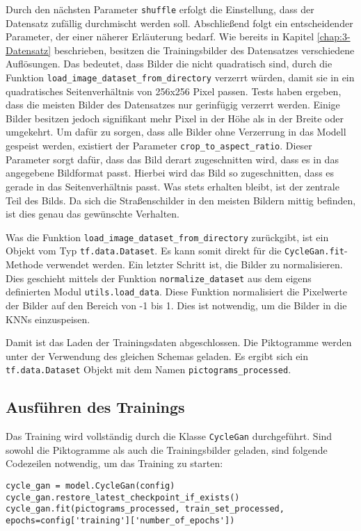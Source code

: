 Durch den nächsten Parameter \texttt{shuffle} erfolgt die Einstellung, dass der Datensatz zufällig durchmischt werden soll. Abschließend folgt ein entscheidender Parameter, der einer näherer Erläuterung bedarf. Wie bereits in Kapitel \ref{chap:3-Datensatz} beschrieben, besitzen die Trainingsbilder des Datensatzes verschiedene Auflösungen. Das bedeutet, dass Bilder die nicht quadratisch sind, durch die Funktion \texttt{load_image_dataset_from_directory} verzerrt würden, damit sie in ein quadratisches Seitenverhältnis von 256x256 Pixel passen. Tests haben ergeben, dass die meisten Bilder des Datensatzes nur gerinfügig verzerrt werden. Einige Bilder besitzen jedoch signifikant mehr Pixel in der Höhe als in der Breite oder umgekehrt. Um dafür zu sorgen, dass alle Bilder ohne Verzerrung in das Modell gespeist werden, existiert der Parameter \texttt{crop_to_aspect_ratio}. Dieser Parameter sorgt dafür, dass das Bild derart zugeschnitten wird, dass es in das angegebene Bildformat passt. Hierbei wird das Bild so zugeschnitten, dass es gerade in das Seitenverhältnis passt. Was stets erhalten bleibt, ist der zentrale Teil des Bilds. Da sich die Straßenschilder in den meisten Bildern mittig befinden, ist dies genau das gewünschte Verhalten.

Was die Funktion \texttt{load_image_dataset_from_directory} zurückgibt, ist ein Objekt vom Typ \texttt{tf.data.Dataset}. Es kann somit direkt für die \texttt{CycleGan.fit}-Methode verwendet werden. Ein letzter Schritt ist, die Bilder zu normalisieren. Dies geschieht mittels der Funktion \texttt{normalize_dataset} aus dem eigens definierten Modul \texttt{utils.load_data}. Diese Funktion normalisiert die Pixelwerte der Bilder auf den Bereich von -1 bis 1. Dies ist notwendig, um die Bilder in die \acp{KNN} einzuspeisen.

Damit ist das Laden der Trainingsdaten abgeschlossen. Die Piktogramme werden unter der Verwendung des gleichen Schemas geladen. Es ergibt sich ein \texttt{tf.data.Dataset} Objekt mit dem Namen \texttt{pictograms_processed}.

\subsection{Ausführen des Trainings}
Das Training wird vollständig durch die Klasse \texttt{CycleGan} durchgeführt. Sind sowohl die Piktogramme als auch die Trainingsbilder geladen, sind folgende Codezeilen notwendig, um das Training zu starten:
\begin{code}
    \begin{verbatim}
cycle_gan = model.CycleGan(config)
cycle_gan.restore_latest_checkpoint_if_exists()
cycle_gan.fit(pictograms_processed, train_set_processed, epochs=config['training']['number_of_epochs'])
    \end{verbatim}
 \end{code}

